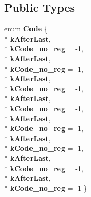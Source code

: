 \subsection*{Public Types}
\begin{DoxyCompactItemize}
\item 
enum {\bfseries Code} \{ \\*
{\bfseries k\+After\+Last}, 
\\*
{\bfseries k\+Code\+\_\+no\+\_\+reg} = -\/1, 
\\*
{\bfseries k\+After\+Last}, 
\\*
{\bfseries k\+Code\+\_\+no\+\_\+reg} = -\/1, 
\\*
{\bfseries k\+After\+Last}, 
\\*
{\bfseries k\+Code\+\_\+no\+\_\+reg} = -\/1, 
\\*
{\bfseries k\+After\+Last}, 
\\*
{\bfseries k\+Code\+\_\+no\+\_\+reg} = -\/1, 
\\*
{\bfseries k\+After\+Last}, 
\\*
{\bfseries k\+Code\+\_\+no\+\_\+reg} = -\/1, 
\\*
{\bfseries k\+After\+Last}, 
\\*
{\bfseries k\+Code\+\_\+no\+\_\+reg} = -\/1, 
\\*
{\bfseries k\+After\+Last}, 
\\*
{\bfseries k\+Code\+\_\+no\+\_\+reg} = -\/1, 
\\*
{\bfseries k\+After\+Last}, 
\\*
{\bfseries k\+Code\+\_\+no\+\_\+reg} = -\/1
 \}\hypertarget{structv8_1_1internal_1_1_register_adca23c370f4ac91047f79bd63778e75c}{}\label{structv8_1_1internal_1_1_register_adca23c370f4ac91047f79bd63778e75c}


\end{DoxyCompactItemize}
